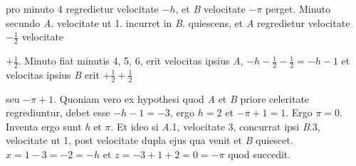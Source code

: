 pro minuto 4 regredietur velocitate $-h$, et \textit{B} velocitate $-\pi$ perget. 
Minuto secundo
\textit{A}. velocitate ut 1. incurret in \textit{B}. quiescens, et \textit{A} regredietur
velocitate $-\displaystyle\frac{1}{2}$ 
velocitate \rule[-2.2ex]{0pt}{5.7ex}$+\displaystyle\frac{1}{2}$. Minuto 
fiat
minutis 4, 5, 6, erit velocitas ipsius \textit{A}, 
$-h-\displaystyle\frac{1}{2}-\displaystyle\frac{1}{2}=-h-1$
et velocitas ipsius \textit{B} erit 
$+\displaystyle\frac{1}{2}+\displaystyle\frac{1}{2}$\rule[-2.4ex]{0pt}{5.7ex} seu $-\pi +1$. 
Quoniam vero ex hypothesi quod \textit{A} et \textit{B} priore 
celeritate regrediuntur, debet esse $-h-1=-3$, ergo $h=2$ et $-\pi +1=1$. 
Ergo $\pi =0$. Inventa ergo sunt \textit{h} et $\pi$. 
Et ideo si \textit{A}.1, velocitate 3, concurrat ipsi \textit{B}.3, velocitate ut 1, post 
velocitate dupla ejus qua venit et \textit{B} quiescet. 
$x=1-3=-2=-h$ et $z=-3+1+2=0=-\pi$ quod succedit. \pend

